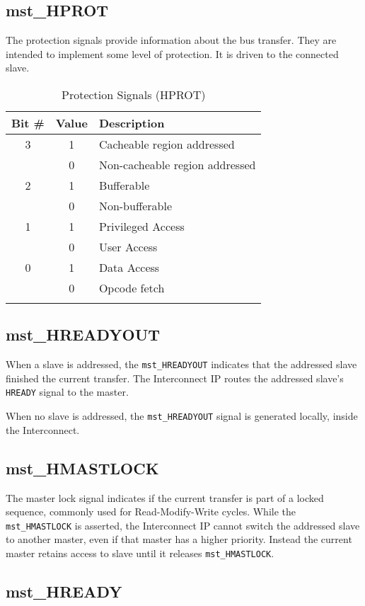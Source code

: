 \subsection{mst\_HPROT}\label{mst_hprot}

The protection signals provide information about the bus transfer. They
are intended to implement some level of protection. It is driven to the
connected slave.

\begin{longtable}[]{@{}ccl@{}}
\toprule
Bit \# & Value & Description\tabularnewline
\midrule
\endhead
3 & 1 & Cacheable region addressed\tabularnewline
& 0 & Non-cacheable region addressed\tabularnewline
2 & 1 & Bufferable\tabularnewline
& 0 & Non-bufferable\tabularnewline
1 & 1 & Privileged Access\tabularnewline
& 0 & User Access\tabularnewline
0 & 1 & Data Access\tabularnewline
& 0 & Opcode fetch\tabularnewline
\bottomrule
\caption{Protection Signals (HPROT)}
\end{longtable}

\subsection{mst\_HREADYOUT}\label{mst_hreadyout}

When a slave is addressed, the \texttt{mst\_HREADYOUT} indicates that the
addressed slave finished the current transfer. The Interconnect IP
routes the addressed slave's \texttt{HREADY} signal to the master.

When no slave is addressed, the \texttt{mst\_HREADYOUT} signal is generated
locally, inside the Interconnect.

\subsection{mst\_HMASTLOCK}\label{mst_hmastlock}

The master lock signal indicates if the current transfer is part of a
locked sequence, commonly used for Read-Modify-Write cycles. While the
\texttt{mst\_HMASTLOCK} is asserted, the Interconnect IP cannot switch the
addressed slave to another master, even if that master has a higher
priority. Instead the current master retains access to slave until it
releases \texttt{mst\_HMASTLOCK}.

\subsection{mst\_HREADY}\label{mst_hready}

